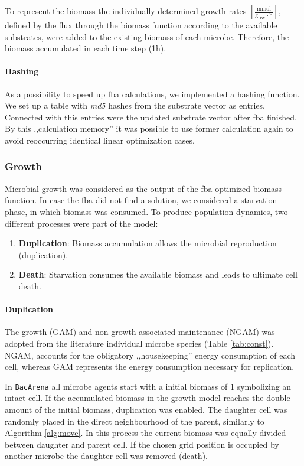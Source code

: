To represent the biomass the individually determined growth rates $[\frac{\mathrm{mmol}}{\mathrm{g_{DW} \cdot \mathrm{h}}}]$, defined by the flux through the biomass function according to the available substrates, were added to the existing biomass of each microbe. Therefore, the biomass accumulated in each time step (1\;h).

\paragraph{Hashing}
As a possibility to speed up fba calculations, we implemented a hashing function.
We set up a table with \textit{md5} hashes from the substrate vector as entries.
Connected with this entries were the updated substrate vector after fba finished.
By this ,,calculation memory'' it was possible to use former calculation again to avoid reoccurring identical linear optimization cases.


\subsubsection{Growth}
Microbial growth was considered as the output of the fba-optimized biomass function. In case the fba did not find a solution, we considered a starvation phase, in which biomass was consumed. 
To produce population dynamics, two different processes were part of the model:
\begin{enumerate}
	\item \textbf{Duplication}: Biomass accumulation allows the microbial reproduction (duplication).
	\item \textbf{Death}: Starvation consumes the available biomass and leads to ultimate cell death.
\end{enumerate}
\paragraph{Duplication}
The growth (GAM) and non growth associated maintenance (NGAM) was adopted from the literature individual microbe species (Table \hyperref[tab:const]{\ref{tab:const}}). NGAM, accounts for the obligatory ,,housekeeping'' energy consumption of each cell, whereas GAM represents the energy consumption necessary for replication. 

In \texttt{BacArena} all microbe agents start with a initial biomass of $1$ symbolizing an intact cell. If the accumulated biomass in the growth model reaches the double amount of the initial biomass, duplication was enabled. The daughter cell was randomly placed in the direct neighbourhood of the parent, similarly to Algorithm \hyperref[alg:move]{\ref{alg:move}}. In this process the current biomass was equally divided between daughter and parent cell. If the chosen grid position is occupied by another microbe the daughter cell was removed (death).
